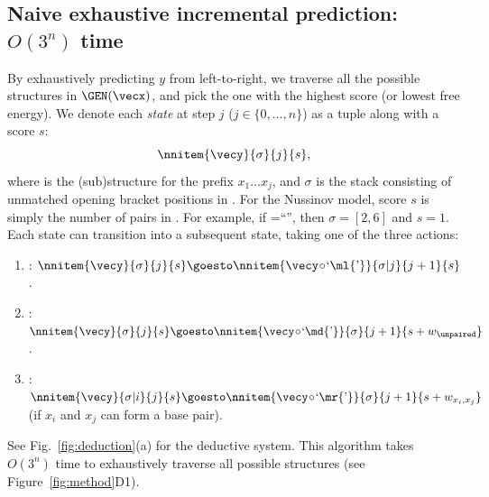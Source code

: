 \subsection*{Naive exhaustive incremental prediction: $O(3^n)$ time}
By exhaustively predicting $y$ from left-to-right, we
traverse all the possible structures in $\GEN(\vecx)$,
and pick the one with the highest score (or lowest free energy). %
We denote each {\em state} at step $j$ ($j \in \{0,\ldots, n\}$)
as a tuple along with a score $s$:
\[
        \nnitem{\vecy}{\sigma}{j}{s},
\]
where \vecy is the (sub)structure for the prefix $x_1 \ldots x_j$,
and
$\sigma$ is the  stack consisting of unmatched opening bracket positions in \vecy.
For the Nussinov model, score $s$ is simply the number of pairs in \vecy.
For example, if \vecy=``\md\ml\ml\md\mr\ml'', then $\sigma=[2,6]$ and $s=1$.
Each state can transition into a subsequent state, taking one of the three
actions:
\begin{enumerate}
\itemsep-0.2em
\item \push:
$\nnitem{\vecy}{\sigma}{j}{s} \goesto \nnitem{\vecy\!\circ\!{\text `}\ml{\text '}}{\sigma | j}{j+1}{s}$.
\item \nskip:
$\nnitem{\vecy}{\sigma}{j}{s} \goesto \nnitem{\vecy\!\circ\!{\text `}\md{\text '}}{\sigma}{j+1}{s + w_\unpaired}$.
\item \pop:
$\nnitem{\vecy}{\sigma | i}{j}{s} \goesto \nnitem{\vecy\!\circ\!{\text `}\mr{\text '}}{\sigma}{j+1}{s+ w_{x_i, x_j}}$
(if $x_i$ and $x_j$ can form a base pair).
\end{enumerate}
See Fig.~\ref{fig:deduction}(a) for the deductive system.
This algorithm takes $O(3^n)$ time to exhaustively traverse all possible
structures (see Figure~\ref{fig:method}D1).

